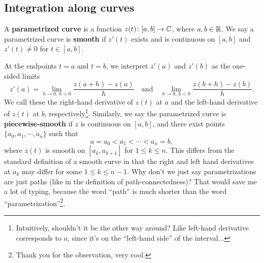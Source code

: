 \subsection{Integration along curves}
\begin{definition}
    A \textbf{parametrized curve} is a function $z(t) \colon [a,b] \to \mathbb{C}$, where $a,b\in \mathbb{R}$. We say a parametrized curve is \textbf{smooth} if $z'(t)$ exists and is continuous on $[a,b]$ and $z'(t)\neq 0$ for $t\in [a,b]$.
\end{definition}
At the endpoints $t=a$ and $t=b$, we interpret $z'(a)$ and $z'(b)$ as the one-sided limits \[
    z'(a)= \lim_{h\to 0, \,h>0}\frac{z(a+h)-z(a)}{h}\quad \text{and} \quad \lim_{h\to 0,\,h<0}\frac{z(b+h)-z(b)}{h}.
\] We call these the right-hand derivative of $z(t)$ at $a$ and the left-hand derivative of $z(t)$ at $b$, respectively\footnote{Intuitively, shouldn't it be the other way around? Like left-hand derivative  corresponds to $a$, since it's on the ``left-hand side'' of the interval...}. Similarly, we say the parametrized curve is \textbf{piecewise-smooth} if $z$ is continuous on $[a,b] $, and there exist points $\{a_0,a_1,\cdots ,a_n\} $ such that \[
a=a_0<a_1< \cdots < a_n=b,
\] where $z(t)$ is smooth on $[a_k,a_{k+1}]$ for $1\leq k \leq n$. This differs from the standard definition of a smooth curve in that the right and left hand derivatives at $a_k$ may differ for some $1\leq k\leq n-1$. Why don't we just say parametrizations are just paths (like in the definition of path-connectedness)? That would save me a lot of typing, because the word ``path'' is much shorter than the word ``parametrization''\footnote{Thank you for the observation, very cool.}.

